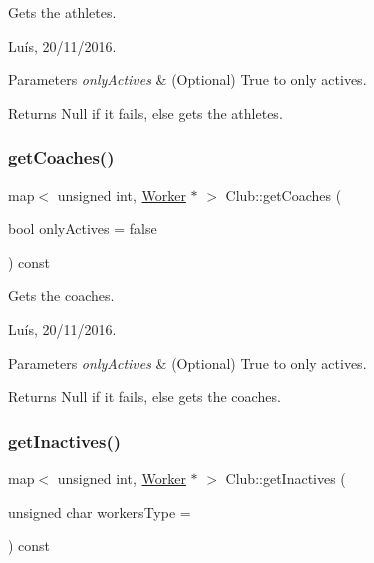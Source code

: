 Gets the athletes. 

Luís, 20/11/2016. 


\begin{DoxyParams}{Parameters}
{\em only\+Actives} & (Optional) True to only actives. \\
\hline
\end{DoxyParams}


\begin{DoxyReturn}{Returns}
Null if it fails, else gets the athletes. 
\end{DoxyReturn}
\hypertarget{class_club_ad93b5a4d38cc3af7decf777a47a26880}{}\label{class_club_ad93b5a4d38cc3af7decf777a47a26880} 
\subsubsection{\texorpdfstring{get\+Coaches()}{getCoaches()}}
{\footnotesize\ttfamily map$<$ unsigned int, \hyperlink{class_worker}{Worker} $\ast$ $>$ Club\+::get\+Coaches (\begin{DoxyParamCaption}\item[{bool}]{only\+Actives = {\ttfamily false} }\end{DoxyParamCaption}) const}



Gets the coaches. 

Luís, 20/11/2016. 


\begin{DoxyParams}{Parameters}
{\em only\+Actives} & (Optional) True to only actives. \\
\hline
\end{DoxyParams}


\begin{DoxyReturn}{Returns}
Null if it fails, else gets the coaches. 
\end{DoxyReturn}
\hypertarget{class_club_a8daf0174b3d095cf6c8480f9bf3ab0e8}{}\label{class_club_a8daf0174b3d095cf6c8480f9bf3ab0e8} 
\subsubsection{\texorpdfstring{get\+Inactives()}{getInactives()}}
{\footnotesize\ttfamily map$<$ unsigned int, \hyperlink{class_worker}{Worker} $\ast$ $>$ Club\+::get\+Inactives (\begin{DoxyParamCaption}\item[{unsigned char}]{workers\+Type = {} }\end{DoxyParamCaption}) const}




